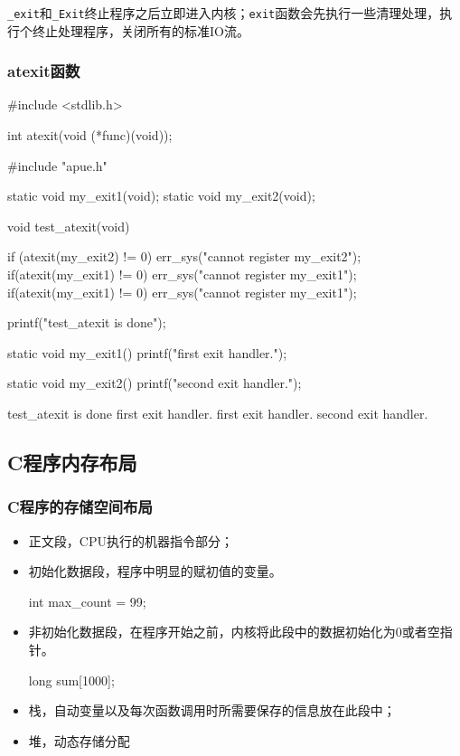\lstinline$_exit$和\lstinline$_Exit$终止程序之后立即进入内核；\lstinline$exit$函数会先执行一些清理处理，执行个终止处理程序，关闭所有的标准IO流。


\subsubsection{atexit函数}

\begin{C}
#include <stdlib.h>

int atexit(void (*func)(void));
\end{C}

\begin{C}
#include "apue.h"

static void my_exit1(void);
static void my_exit2(void);

void test_atexit(void)
{
	if (atexit(my_exit2) != 0)
		err_sys("cannot register my_exit2");
	if(atexit(my_exit1) != 0)
		err_sys("cannot register my_exit1");
	if(atexit(my_exit1) != 0)
		err_sys("cannot register my_exit1");

	printf("test_atexit is done\n");
}

static void my_exit1()
{
	printf("first exit handler.\n");
}

static void my_exit2()
{
	printf("second exit handler.\n");
}
\end{C}

\begin{Command-Line}[执行结果]
test_atexit is done
first exit handler.
first exit handler.
second exit handler.
\end{Command-Line}


\subsection{C程序内存布局}

\subsubsection{C程序的存储空间布局}


\begin{itemize}
\item 正文段，CPU执行的机器指令部分；
\item 初始化数据段，程序中明显的赋初值的变量。
\begin{C}[出现在任何函数之外的声明]
int max_count = 99;
\end{C}
\item 非初始化数据段，在程序开始之前，内核将此段中的数据初始化为0或者空指针。
\begin{C}[出现在任何函数外的C声明]
long sum[1000];
\end{C}
\item 栈，自动变量以及每次函数调用时所需要保存的信息放在此段中；
\item 堆，动态存储分配
\end{itemize}

